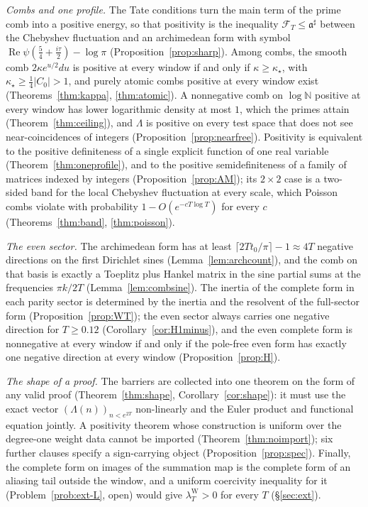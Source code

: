 \documentclass[11pt]{amsart}
\theoremstyle{definition}
\theoremstyle{remark}
\newcommand{\N}{\mathbb N}
\newcommand{\Rel}{\operatorname{Re}}
\newcommand{\lamW}{\lambda^{\mathrm W}_T}
\begin{document}
\emph{Combs and one profile.} The Tate conditions turn the main term of the prime comb into a positive energy, so that
positivity is the inequality $\mathcal F_T\le\mathfrak a^\sharp$ between the Chebyshev fluctuation and an archimedean form with
symbol $\Rel\psi(\frac54+\frac{i\tau}2)-\log\pi$ (Proposition~\ref{prop:sharp}). Among combs, the smooth comb $2\kappa e^{u/2}du$ is
positive at every window if and only if $\kappa\ge\kappa_\star$, with $\kappa_\star\ge\frac14|C_0|>1$, and purely atomic combs positive
at every window exist (Theorems~\ref{thm:kappa}, \ref{thm:atomic}). A nonnegative comb on $\log\N$ positive at every window has
lower logarithmic density at most $1$, which the primes attain (Theorem~\ref{thm:ceiling}), and $\Lambda$ is positive on every test space that does not
see near-coincidences of integers (Proposition~\ref{prop:nearfree}). Positivity is equivalent to the positive definiteness of a single
explicit function of one real variable (Theorem~\ref{thm:oneprofile}), and to the positive semidefiniteness of a family of matrices
indexed by integers (Proposition~\ref{prop:AM}); its $2\times2$ case is a two-sided band for the local Chebyshev fluctuation at
every scale, which Poisson combs violate with probability $1-O(e^{-cT\log T})$ for every $c$ (Theorems~\ref{thm:band},
\ref{thm:poisson}).

\emph{The even sector.} The archimedean form has at least $\lceil2Tt_0/\pi\rceil-1\approx4T$ negative directions on the
first Dirichlet sines (Lemma~\ref{lem:archcount}), and the comb on that basis is exactly a Toeplitz plus Hankel matrix in
the sine partial sums at the frequencies $\pi k/2T$ (Lemma~\ref{lem:combsine}). The inertia of the complete form in each
parity sector is determined by the inertia and the resolvent of the full-sector form (Proposition~\ref{prop:WT}); the even
sector always carries one negative direction for $T\ge0.12$ (Corollary~\ref{cor:H1minus}), and the even complete form is
nonnegative at every window if and only if the pole-free even form has exactly one negative direction at every window
(Proposition~\ref{prop:H}).

\emph{The shape of a proof.} The barriers are collected into one theorem on the form of any valid proof
(Theorem~\ref{thm:shape}, Corollary~\ref{cor:shape}): it must use the exact vector $(\Lambda(n))_{n<e^{2T}}$ non-linearly
and the Euler product and functional equation jointly. A positivity theorem whose construction is uniform over the
degree-one weight data cannot be imported (Theorem~\ref{thm:noimport}); six further clauses specify a sign-carrying
object (Proposition~\ref{prop:spec}). Finally, the complete form on images of the summation map is the complete form of
an aliasing tail outside the window, and a uniform coercivity inequality for it (Problem~\ref{prob:ext-L}, open) would
give $\lamW>0$ for every $T$ (\S\ref{sec:ext}).
\end{document}
